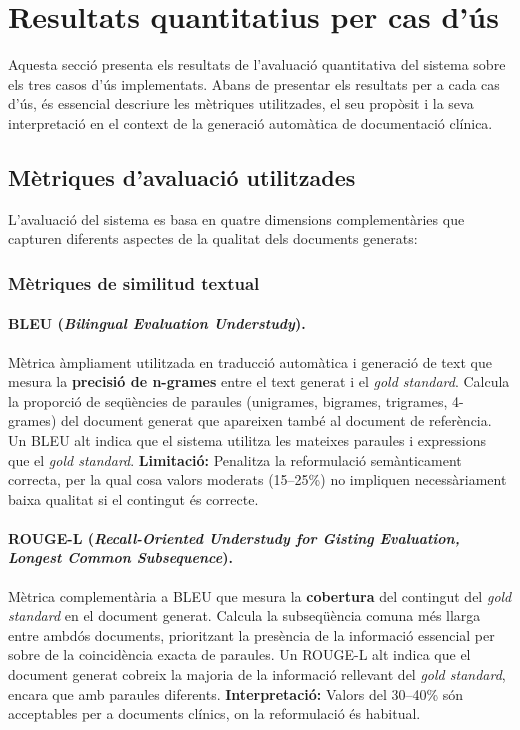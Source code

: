 \documentclass[CAT]{TFUOC}%
\begin{document}
\section{Resultats quantitatius per cas d'ús}

Aquesta secció presenta els resultats de l'avaluació quantitativa del sistema sobre els tres casos d'ús implementats. Abans de presentar els resultats per a cada cas d'ús, és essencial descriure les mètriques utilitzades, el seu propòsit i la seva interpretació en el context de la generació automàtica de documentació clínica.

\subsection{Mètriques d'avaluació utilitzades}

L'avaluació del sistema es basa en quatre dimensions complementàries que capturen diferents aspectes de la qualitat dels documents generats:

\subsubsection{Mètriques de similitud textual}

\paragraph{BLEU (\textit{Bilingual Evaluation Understudy}).}
Mètrica àmpliament utilitzada en traducció automàtica i generació de text que mesura la \textbf{precisió de n-grames} entre el text generat i el \textit{gold standard}. Calcula la proporció de seqüències de paraules (unigrames, bigrames, trigrames, 4-grames) del document generat que apareixen també al document de referència. Un BLEU alt indica que el sistema utilitza les mateixes paraules i expressions que el \textit{gold standard}. \textbf{Limitació:} Penalitza la reformulació semànticament correcta, per la qual cosa valors moderats (15--25\%) no impliquen necessàriament baixa qualitat si el contingut és correcte.

\paragraph{ROUGE-L (\textit{Recall-Oriented Understudy for Gisting Evaluation, Longest Common Subsequence}).}
Mètrica complementària a BLEU que mesura la \textbf{cobertura} del contingut del \textit{gold standard} en el document generat. Calcula la subseqüència comuna més llarga entre ambdós documents, prioritzant la presència de la informació essencial per sobre de la coincidència exacta de paraules. Un ROUGE-L alt indica que el document generat cobreix la majoria de la informació rellevant del \textit{gold standard}, encara que amb paraules diferents. \textbf{Interpretació:} Valors del 30--40\% són acceptables per a documents clínics, on la reformulació és habitual.
\end{document}
